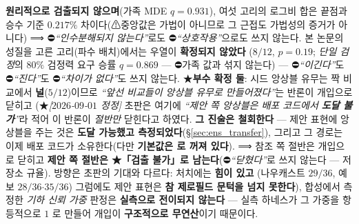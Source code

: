\documentclass[11pt]{report}
\numberwithin{equation}{chapter}
\numberwithin{figure}{chapter}
\numberwithin{table}{chapter}
\begin{document}
\begin{enumerate}
        \textbf{원리적으로 검출되지 않으며}(가족 MDE $q = 0.931$), 여섯 고리의 로그비 합은
        끝점과 승수 기준 \textbf{$0.217\%$} 차이다(⚠중앙값은 가법이 아니므로 그 근접도
        가법성의 증거가 아니다) ⟹ ⛔\emph{``인수분해되지 않는다''}로도
        ⛔\emph{``상호작용''}으로도 쓰지 않는다.
        본 논문의 성질을 고른 고리(파수 배치)에서는 우열이 \textbf{확정되지 않았다}
        ($8/12$, $p = 0.19$; \emph{단일 검정}의 $80\%$ 검정력 요구 승률 $q = 0.869$
        --- ⛔가족 값과 섞지 않는다) ---
        ⛔\emph{``이긴다''}도 ⛔\emph{``진다''}도 ⛔\emph{``차이가 없다''}도 쓰지 않는다.
        ★\textbf{부수 확정 둘}: 시드 앙상블 유무는 짝 비교에서 \textbf{널}($5/12$)이므로
        \emph{``앞선 비교들이 앙상블 유무로 만들어졌다''}는 반론이 개입으로 닫히고
        (★\emph{[$2026$-$09$-$01$ 정정]} 초판은 여기에
        \emph{``제안 쪽 앙상블은 배포 코드에서 \textbf{도달 불가}''}라 적어 이 반론이
        \emph{절반만} 닫힌다고 하였다. \textbf{그 진술은 철회한다} --- 제안 표현에
        앙상블을 주는 것은 \textbf{도달 가능했고 측정되었다}(\S\ref{sec:ens_transfer}),
        그리고 그 경로는 이제 배포 코드가 소유한다(다만 \textbf{기본값은
        \DeployLearnedEnsembleK{} 로 꺼져 있다}). ⟹ 참조 쪽 절반은 개입으로 닫히고
        \textbf{제안 쪽 절반은 ★\textbf{「검출 불가」}로 남는다}(⛔\emph{``닫혔다''}로
        쓰지 않는다 --- 저장소 규율). 방향은 초판의 기대와 다르다: 처치에는 \textbf{힘이 있고}
        (나우캐스트 $29/36$, 예보 $28/36$$\cdot$$35/36$) 그럼에도 제안 표현은
        \textbf{참 제로필드 문턱을 넘지 못한다}),
        합성에서 측정한 \emph{기하 신뢰 가중} 판정은 \textbf{실측으로 전이되지 않는다}
        --- 실측 하네스가 그 가중을 항등적으로 $1$ 로 만들어 개입이 \textbf{구조적으로
        무연산}이기 때문이다.


\end{enumerate}
\end{document}
